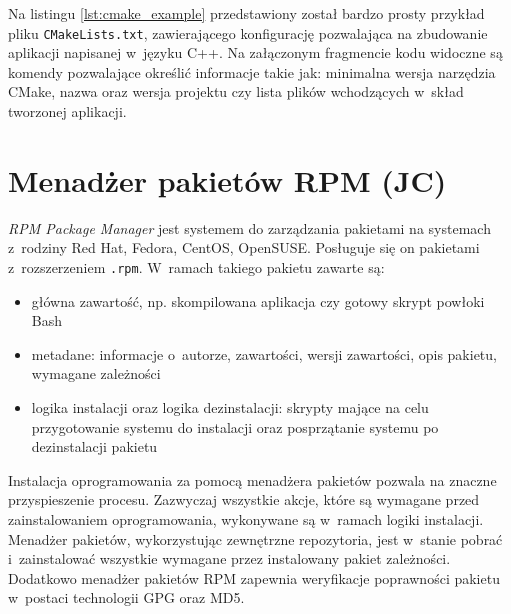 Na listingu \ref{lst:cmake_example} przedstawiony został bardzo prosty przykład pliku \lstinline{CMakeLists.txt}, zawierającego konfigurację pozwalająca na zbudowanie aplikacji napisanej w~języku C++. Na załączonym fragmencie kodu widoczne są komendy pozwalające określić informacje takie jak: minimalna wersja narzędzia CMake, nazwa oraz wersja projektu czy lista plików wchodzących w~skład tworzonej aplikacji.



\section{Menadżer pakietów RPM (JC)}
\emph{RPM Package Manager} \cite{rpm} \cite{rpm_wiki} jest systemem do zarządzania pakietami na systemach z~rodziny Red Hat, Fedora, CentOS, OpenSUSE. Posługuje się on pakietami z~rozszerzeniem \lstinline{.rpm}. W~ramach takiego pakietu zawarte są:
\begin{itemize}
    \item główna zawartość, np. skompilowana aplikacja czy gotowy skrypt powłoki Bash \cite{bash}
    \item metadane: informacje o~autorze, zawartości, wersji zawartości, opis pakietu, wymagane zależności
    \item logika instalacji oraz logika dezinstalacji: skrypty mające na celu przygotowanie systemu do instalacji oraz posprzątanie systemu po dezinstalacji pakietu
\end{itemize}

Instalacja oprogramowania za pomocą menadżera pakietów pozwala na znaczne przyspieszenie procesu. Zazwyczaj wszystkie akcje, które są wymagane przed zainstalowaniem oprogramowania, wykonywane są w~ramach logiki instalacji. Menadżer pakietów, wykorzystując zewnętrzne repozytoria, jest w~stanie pobrać i~zainstalować wszystkie wymagane przez instalowany pakiet zależności. Dodatkowo menadżer pakietów RPM zapewnia weryfikacje poprawności pakietu w~postaci technologii GPG oraz MD5.

